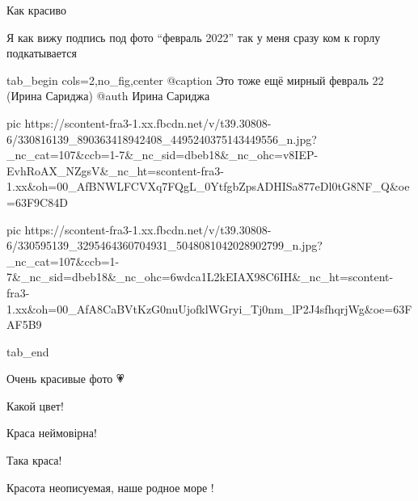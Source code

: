  
 
 
 
 

\qqSecCmt


Как красиво💙💙💙


Я как вижу подпись под фото \enquote{февраль 2022} так у меня сразу ком к горлу подкатывается

\begin{center}
\begin{minipage}{\textwidth}

\ifcmt
  tab_begin cols=2,no_fig,center
    @caption Это тоже ещё мирный февраль 22 (Ирина Сариджа)
    @auth Ирина Сариджа

     pic https://scontent-fra3-1.xx.fbcdn.net/v/t39.30808-6/330816139_890363418942408_4495240375143449556_n.jpg?_nc_cat=107&ccb=1-7&_nc_sid=dbeb18&_nc_ohc=v8IEP-EvhRoAX_NZgsV&_nc_ht=scontent-fra3-1.xx&oh=00_AfBNWLFCVXq7FQgL_0YtfgbZpsADHISa877eDl0tG8NF_Q&oe=63F9C84D

     pic https://scontent-fra3-1.xx.fbcdn.net/v/t39.30808-6/330595139_3295464360704931_5048081042028902799_n.jpg?_nc_cat=107&ccb=1-7&_nc_sid=dbeb18&_nc_ohc=6wdca1L2kEIAX98C6IH&_nc_ht=scontent-fra3-1.xx&oh=00_AfA8CaBVtKzG0nuUjofklWGryi_Tj0nm_lP2J4sfhqrjWg&oe=63FAF5B9

  tab_end
\fi
\end{minipage}
\end{center}


Очень красивые фото 💗💙


Какой цвет!


Краса неймовірна!


Така краса!


Красота неописуемая, наше родное море !

